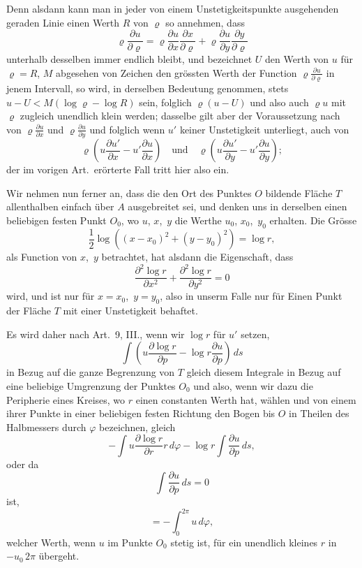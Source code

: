 \documentclass[a4paper,12pt]{article}
\begin{document}
Denn alsdann kann man in jeder von einem Unstetigkeitspunkte
ausgehenden geraden Linie einen Werth $R$ von $\varrho$ so
annehmen, dass
\[ \varrho \frac{\partial u}{\partial \varrho}
   =   \varrho \frac{\partial u}{\partial x}
               \frac{\partial x}{\partial \varrho}
     + \varrho \frac{\partial u}{\partial y}
               \frac{\partial y}{\partial \varrho} \]
unterhalb desselben immer endlich bleibt, und bezeichnet $U$ den
Werth von $u$ f\"{u}r $\varrho = R$, $M$ abgesehen von Zeichen
den gr\"{o}ssten Werth der Function
$\displaystyle \varrho \frac{\partial u}{\partial \varrho}$
in jenem Intervall, so wird, in derselben Bedeutung genommen,
stets
$u - U < M (\log \varrho - \log R)$
sein, folglich $\varrho (u - U)$ und also auch $\varrho u$ mit
$\varrho$ zugleich unendlich klein werden; dasselbe gilt aber der
Voraussetzung nach von
$\displaystyle \varrho \frac{\partial u}{\partial x}$
und
$\displaystyle \varrho \frac{\partial u}{\partial y}$
und folglich wenn $u'$ keiner Unstetigkeit unterliegt, auch von
\[ \varrho \left( u \frac{\partial u'}{\partial x}
   - u' \frac{\partial u}{\partial x} \right)
      \quad\mbox{und}\quad
   \varrho \left( u \frac{\partial u'}{\partial y}
   - u' \frac{\partial u}{\partial y} \right);\]
der im vorigen Art.\ er\"{o}rterte Fall tritt hier also ein.

Wir nehmen nun ferner an, dass die den Ort des Punktes $O$
bildende Fl\"{a}che $T$ allenthalben einfach \"{u}ber $A$
ausgebreitet sei, und denken uns in derselben einen beliebigen
festen Punkt $O_0$, wo $u$, $x$,~$y$ die Werthe
$u_0$, $x_0$,~$y_0$ erhalten.  Die Gr\"{o}sse
\[ {\textstyle\frac{1}{2}} \log
         ((x - x_0)^2 + (y - y_0)^2) = \log r,\]
als Function von $x$,~$y$ betrachtet, hat alsdann die
Eigenschaft, dass
\[    \frac{\partial^2 \log r}{\partial x^2}
    + \frac{\partial^2 \log r}{\partial y^2}
   = 0 \]
wird, und ist nur f\"{u}r $x = x_0$,~$y = y_0$, also in unserm
Falle nur f\"{u}r Einen Punkt der Fl\"{a}che $T$ mit einer
Unstetigkeit behaftet.

Es wird daher nach Art.~9, III., wenn wir $\log r$ f\"{u}r $u'$
setzen,
\[ \int  \left(
            u  \frac{\partial \log r}{\partial p}
          - \log r \frac{\partial u }{\partial p}
         \right) \, ds \]
in Bezug auf die ganze Begrenzung von $T$ gleich diesem Integrale
in Bezug auf eine beliebige Umgrenzung der Punktes $O_0$ und
also, wenn wir dazu die Peripherie eines Kreises, wo $r$ einen
constanten Werth hat, w\"{a}hlen und von einem ihrer Punkte in
einer beliebigen festen Richtung den Bogen bis $O$ in Theilen des
Halbmessers durch $\varphi$ bezeichnen, gleich
\[ - \int u  \frac{\partial \log r}{\partial r} r \, d \varphi
      - \log r \int \frac{\partial u }{\partial p} \, ds,\]
oder da
\[ \int \frac{\partial u }{\partial p} \, ds = 0 \]
ist,
\[ = - \int_0^{2\pi} u \, d \varphi,\]
welcher Werth, wenn $u$ im Punkte $O_0$ stetig ist, f\"{u}r ein
unendlich kleines $r$ in $-u_0 \, 2\pi$ \"{u}bergeht.
\end{document}
